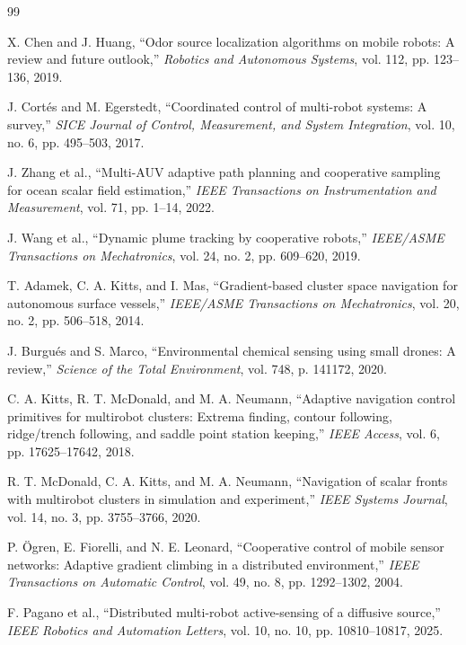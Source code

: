 \documentclass[lettersize,journal]{IEEEtran}
\begin{document}
\begin{thebibliography}{99}

 X. Chen and J. Huang, ``Odor source localization algorithms on mobile robots: A review and future outlook,'' \textit{Robotics and Autonomous Systems}, vol. 112, pp. 123--136, 2019.

 J. Cort\'es and M. Egerstedt, ``Coordinated control of multi-robot systems: A survey,'' \textit{SICE Journal of Control, Measurement, and System Integration}, vol. 10, no. 6, pp. 495--503, 2017.

 J. Zhang et al., ``Multi-AUV adaptive path planning and cooperative sampling for ocean scalar field estimation,'' \textit{IEEE Transactions on Instrumentation and Measurement}, vol. 71, pp. 1--14, 2022.

 J. Wang et al., ``Dynamic plume tracking by cooperative robots,'' \textit{IEEE/ASME Transactions on Mechatronics}, vol. 24, no. 2, pp. 609--620, 2019.

 T. Adamek, C. A. Kitts, and I. Mas, ``Gradient-based cluster space navigation for autonomous surface vessels,'' \textit{IEEE/ASME Transactions on Mechatronics}, vol. 20, no. 2, pp. 506--518, 2014.

 J. Burgu\'es and S. Marco, ``Environmental chemical sensing using small drones: A review,'' \textit{Science of the Total Environment}, vol. 748, p. 141172, 2020.

 C. A. Kitts, R. T. McDonald, and M. A. Neumann, ``Adaptive navigation control primitives for multirobot clusters: Extrema finding, contour following, ridge/trench following, and saddle point station keeping,'' \textit{IEEE Access}, vol. 6, pp. 17625--17642, 2018.

 R. T. McDonald, C. A. Kitts, and M. A. Neumann, ``Navigation of scalar fronts with multirobot clusters in simulation and experiment,'' \textit{IEEE Systems Journal}, vol. 14, no. 3, pp. 3755--3766, 2020.

 P. \"Ogren, E. Fiorelli, and N. E. Leonard, ``Cooperative control of mobile sensor networks: Adaptive gradient climbing in a distributed environment,'' \textit{IEEE Transactions on Automatic Control}, vol. 49, no. 8, pp. 1292--1302, 2004.

 F. Pagano et al., ``Distributed multi-robot active-sensing of a diffusive source,'' \textit{IEEE Robotics and Automation Letters}, vol. 10, no. 10, pp. 10810--10817, 2025.


\end{thebibliography}
\end{document}
